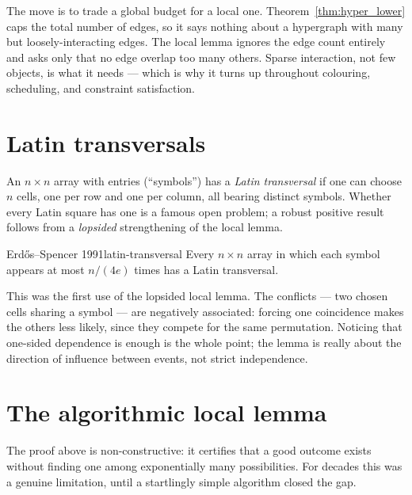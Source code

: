 \begin{insight}
The move is to trade a global budget for a local one.
Theorem~\ref{thm:hyper_lower} caps the total number of edges, so it says nothing
about a hypergraph with many but loosely-interacting edges. The local lemma
ignores the edge count entirely and asks only that no edge overlap too many
others. Sparse interaction, not few objects, is what it needs --- which is why it
turns up throughout colouring, scheduling, and constraint satisfaction.
\end{insight}

\section{Latin transversals}

An $n\times n$ array with entries (``symbols'') has a \emph{Latin transversal} if
one can choose $n$ cells, one per row and one per column, all bearing distinct
symbols. Whether every Latin square has one is a famous open problem; a robust
positive result follows from a \emph{lopsided} strengthening of the local lemma.

\begin{theorem}{Erd\H{o}s--Spencer 1991}{latin-transversal}
Every $n\times n$ array in which each symbol appears at most $n/(4e)$ times has a
Latin transversal.
\end{theorem}

\begin{insight}
This was the first use of the lopsided local lemma. The conflicts --- two chosen
cells sharing a symbol --- are negatively associated: forcing one coincidence
makes the others less likely, since they compete for the same permutation.
Noticing that one-sided dependence is enough is the whole point; the lemma is
really about the direction of influence between events, not strict
independence.
\end{insight}

\section{The algorithmic local lemma}

The proof above is non-constructive: it certifies that a good outcome exists
without finding one among exponentially many possibilities. For decades this was
a genuine limitation, until a startlingly simple algorithm closed the gap.

